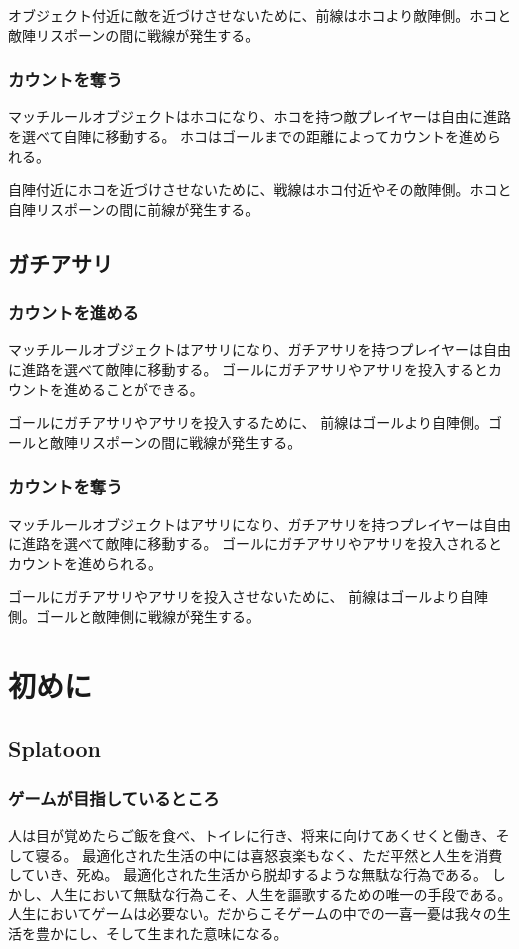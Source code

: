 \documentclass[a4paper,11pt]{jsbook}
\begin{document}
オブジェクト付近に敵を近づけさせないために、前線はホコより敵陣側。ホコと敵陣リスポーンの間に戦線が発生する。


\subsection{カウントを奪う}
マッチルールオブジェクトはホコになり、ホコを持つ敵プレイヤーは自由に進路を選べて自陣に移動する。
ホコはゴールまでの距離によってカウントを進められる。

自陣付近にホコを近づけさせないために、戦線はホコ付近やその敵陣側。ホコと自陣リスポーンの間に前線が発生する。

\section{ガチアサリ}
\subsection{カウントを進める}
マッチルールオブジェクトはアサリになり、ガチアサリを持つプレイヤーは自由に進路を選べて敵陣に移動する。
ゴールにガチアサリやアサリを投入するとカウントを進めることができる。

ゴールにガチアサリやアサリを投入するために、
前線はゴールより自陣側。ゴールと敵陣リスポーンの間に戦線が発生する。

\subsection{カウントを奪う}
マッチルールオブジェクトはアサリになり、ガチアサリを持つプレイヤーは自由に進路を選べて敵陣に移動する。
ゴールにガチアサリやアサリを投入されるとカウントを進められる。

ゴールにガチアサリやアサリを投入させないために、
前線はゴールより自陣側。ゴールと敵陣側に戦線が発生する。


\chapter{初めに}
\section{Splatoon}
\subsection{ゲームが目指しているところ}
人は目が覚めたらご飯を食べ、トイレに行き、将来に向けてあくせくと働き、そして寝る。
最適化された生活の中には喜怒哀楽もなく、ただ平然と人生を消費していき、死ぬ。
最適化された生活から脱却するような無駄な行為である。
しかし、人生において無駄な行為こそ、人生を謳歌するための唯一の手段である。
人生においてゲームは必要ない。だからこそゲームの中での一喜一憂は我々の生活を豊かにし、そして生まれた意味になる。
\end{document}
